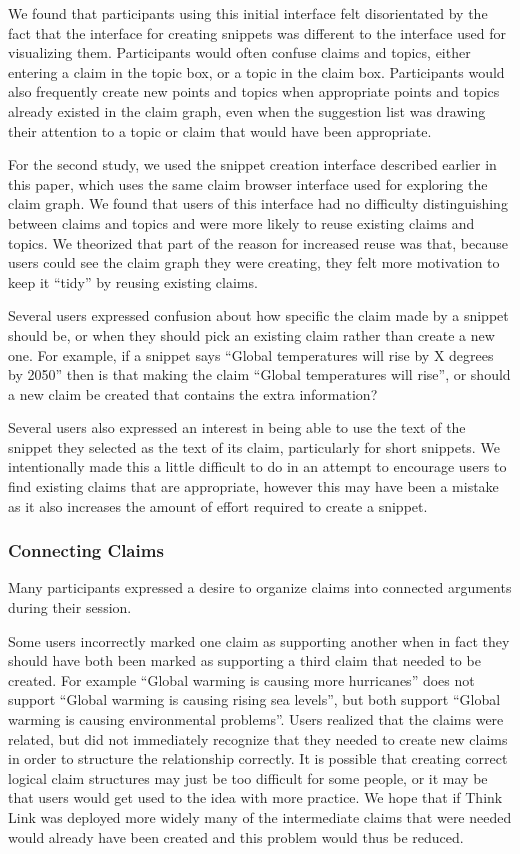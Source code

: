\documentclass{chi2009}
\begin{document}
We found that participants using this initial interface felt disorientated by the fact that the interface for creating snippets was different to the interface used for visualizing them. Participants would often confuse claims and topics, either entering a claim in the topic box, or a topic in the claim box. Participants would also frequently create new points and topics when appropriate points and topics already existed in the claim graph, even when the suggestion list was drawing their attention to a topic or claim that would have been appropriate.

For the second study, we used the snippet creation interface described earlier in this paper, which uses the same claim browser interface used for exploring the claim graph. We found that users of this interface had no difficulty distinguishing between claims and topics and were more likely to reuse existing claims and topics. We theorized that part of the reason for increased reuse was that, because users could see the claim graph they were creating, they felt more motivation to keep it ``tidy'' by reusing existing claims.

Several users expressed confusion about how specific the claim made by a snippet should be, or when they should pick an existing claim rather than create a new one. For example, if a snippet says ``Global temperatures will rise by X degrees by 2050'' then is that making the claim ``Global temperatures will rise'', or should a new claim be created that contains the extra information? 

Several users also expressed an interest in being able to use the text of the snippet they selected as the text of its claim, particularly for short snippets. We intentionally made this a little difficult to do in an attempt to encourage users to find existing claims that are appropriate, however this may have been a mistake as it also increases the amount of effort required to create a snippet.

\subsubsection{Connecting Claims}

Many participants expressed a desire to organize claims into connected arguments during their session. 

Some users incorrectly marked one claim as supporting another when in fact they should have both been marked as supporting a third claim that needed to be created. For example ``Global warming is causing more hurricanes'' does not support ``Global warming is causing rising sea levels'', but both support ``Global warming is causing environmental problems''. Users realized that the claims were related, but did not immediately recognize that they needed to create new claims in order to structure the relationship correctly. It is possible that creating correct logical claim structures may just be too difficult for some people, or it may be that users would get used to the idea with more practice. We hope that if Think Link was deployed more widely many of the intermediate claims that were needed would already have been created and this problem would thus be reduced.
\end{document}
